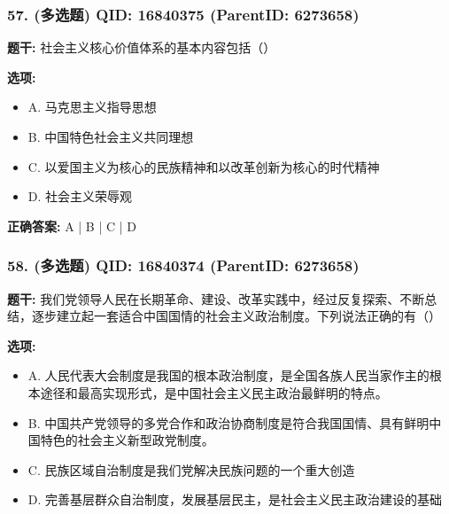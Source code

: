 \documentclass[12pt,UTF8]{ctexart}
\begin{document}
\subsubsection*{57. (多选题) \small QID: 16840375 (ParentID: 6273658)}

\textbf{题干:}
社会主义核心价值体系的基本内容包括（）



\textbf{选项:}
\begin{itemize}[leftmargin=*]

  \item A. 马克思主义指导思想

  \item B. 中国特色社会主义共同理想

  \item C. 以爱国主义为核心的民族精神和以改革创新为核心的时代精神

  \item D. 社会主义荣辱观

\end{itemize}

\textbf{正确答案:}
A | B | C | D

\vspace{0.3em}\hrulefill\vspace{0.7em}

\subsubsection*{58. (多选题) \small QID: 16840374 (ParentID: 6273658)}

\textbf{题干:}
我们党领导人民在长期革命、建设、改革实践中，经过反复探索、不断总结，逐步建立起一套适合中国国情的社会主义政治制度。下列说法正确的有（）



\textbf{选项:}
\begin{itemize}[leftmargin=*]

  \item A. 人民代表大会制度是我国的根本政治制度，是全国各族人民当家作主的根本途径和最高实现形式，是中国社会主义民主政治最鲜明的特点。

  \item B. 中国共产党领导的多党合作和政治协商制度是符合我国国情、具有鲜明中国特色的社会主义新型政党制度。

  \item C. 民族区域自治制度是我们党解决民族问题的一个重大创造

  \item D. 完善基层群众自治制度，发展基层民主，是社会主义民主政治建设的基础

\end{itemize}
\end{document}
